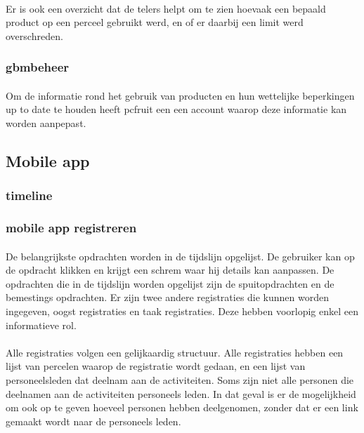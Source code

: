 \paragraph {} Er is ook een overzicht dat de telers helpt om te zien hoevaak een bepaald
product op een perceel gebruikt werd, en of er daarbij een limit werd overschreden.


\subsubsection {gbmbeheer}

\paragraph {} Om de informatie rond het gebruik van producten en hun wettelijke
beperkingen up to date te houden heeft pcfruit een een account waarop deze informatie kan
worden aanpepast.


\subsection {Mobile app}

\subsubsection {timeline}

\subsubsection {mobile app registreren}

\paragraph {} De belangrijkste opdrachten worden in de tijdslijn opgelijst. De gebruiker
kan op de opdracht klikken en krijgt een schrem waar hij details kan aanpassen. De
opdrachten die in de tijdslijn worden opgelijst zijn de spuitopdrachten en de bemestings
opdrachten. Er zijn twee andere registraties die kunnen worden ingegeven, oogst
registraties en taak registraties. Deze hebben voorlopig enkel een informatieve rol.

\paragraph {} Alle registraties volgen een gelijkaardig structuur. Alle registraties
hebben een lijst van percelen waarop de registratie wordt gedaan, en een lijst van
personeelsleden dat deelnam aan de activiteiten. Soms zijn niet alle personen die
deelnamen aan de activiteiten personeels leden. In dat geval is er de mogelijkheid om ook
op te geven hoeveel personen hebben deelgenomen, zonder dat er een link gemaakt wordt naar
de personeels leden.

